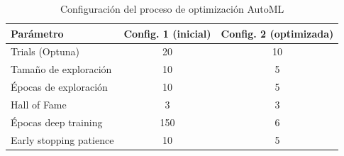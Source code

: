 \begin{table}[htbp]
\centering
\caption{Configuración del proceso de optimización AutoML}
\label{tab:config_automl}
\begin{tabular}{lcc}
\toprule
\textbf{Parámetro} & \textbf{Config. 1 (inicial)} & \textbf{Config. 2 (optimizada)} \\
\midrule
  Trials (Optuna) & 20 & 10 \\
  Tamaño de exploración & 10 & 5 \\
  Épocas de exploración & 10 & 5 \\
  Hall of Fame & 3 & 3 \\
  Épocas deep training & 150 & 6 \\
  Early stopping patience & 10 & 5 \\
\bottomrule
\end{tabular}
\end{table}